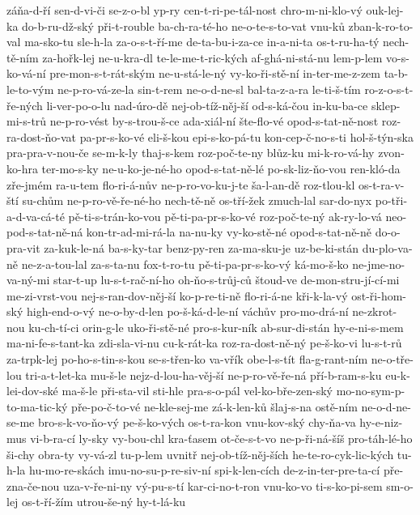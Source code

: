 záňa-d-ří
sen-d-vi-či
se-z-o-bl
yp-ry
cen-t-ri-pe-tál-nost
chro-m-ni-klo-vý
ouk-lej-ka
do-b-ru-dž-ský
při-t-rouble
ba-ch-ra-té-ho
ne-o-te-s-to-vat
vnu-ků
zban-k-ro-to-val
ma-sko-tu
sle-h-la
za-o-s-t-ří-me
de-ta-bu-i-za-ce
in-a-ni-ta
os-t-ru-ha-tý
nech-tě-ním
za-hořk-lej
ne-u-kra-dl
te-le-me-t-ric-kých
af-ghá-ni-stá-nu
lem-p-lem
vo-s-ko-vá-ní
pre-mon-s-t-rát-ským
ne-u-stá-le-ný
vy-ko-ři-stě-ní
in-ter-me-z-zem
ta-b-le-to-vým
ne-p-ro-vá-ze-la
sin-t-rem
ne-o-d-ne-sl
bal-ta-z-a-ra
le-ti-š-tím
ro-z-o-s-t-ře-ných
li-ver-po-o-lu
nad-úro-dě
nej-ob-tíž-něj-ší
od-s-ká-čou
in-ku-ba-ce
sklep-mi-s-trů
ne-p-ro-vést
by-s-trou-š-ce
ada-xiál-ní
šte-flo-vé
opod-s-tat-ně-nost
roz-ra-dost-ňo-vat
pa-pr-s-ko-vé
eli-š-kou
epi-s-ko-pá-tu
kon-cep-č-no-s-ti
hol-š-týn-ska
pra-pra-v-nou-če
se-m-k-ly
thaj-s-kem
roz-poč-te-ny
blůz-ku
mi-k-ro-vá-hy
zvon-ko-hra
ter-mo-s-ky
ne-u-ko-je-né-ho
opod-s-tat-ně-lé
po-sk-liz-ňo-vou
ren-kló-da
zře-jmém
ra-u-tem
flo-ri-á-nův
ne-p-ro-vo-ku-j-te
ša-l-an-dě
roz-tlou-kl
os-t-ra-v-ští
su-chům
ne-p-ro-vě-ře-né-ho
nech-tě-ně
os-tří-žek
zmuch-lal
sar-do-nyx
po-tři-a-d-va-cá-té
pě-ti-s-trán-ko-vou
pě-ti-pa-pr-s-ko-vé
roz-poč-te-ný
ak-ry-lo-vá
neo-pod-s-tat-ně-ná
kon-tr-ad-mi-rá-la
na-nu-ky
vy-ko-stě-né
opod-s-tat-ně-ně
do-o-pra-vit
za-kuk-le-ná
ba-s-ky-tar
benz-py-ren
za-ma-sku-je
uz-be-ki-stán
du-plo-va-ně
ne-z-a-tou-lal
za-s-ta-nu
fox-t-ro-tu
pě-ti-pa-pr-s-ko-vý
ká-mo-š-ko
ne-jme-no-va-ný-mi
star-t-up
lu-s-t-rač-ní-ho
oh-ňo-s-trůj-ců
štoud-ve
de-mon-stru-jí-cí-mi
me-zi-vrst-vou
nej-s-ran-dov-něj-ší
ko-p-re-ti-ně
flo-ri-á-ne
kři-k-la-vý
ost-ři-hom-ský
high-end-o-vý
ne-o-by-d-len
po-š-ká-d-le-ní
váchův
pro-mo-drá-ní
ne-zkrot-nou
ku-ch-tí-ci
orin-g-le
uko-ři-stě-né
pro-s-kur-ník
ab-sur-di-stán
hy-e-ni-s-mem
ma-ni-fe-s-tant-ka
zdi-sla-vi-nu
cu-k-rát-ka
roz-ra-dost-ně-ný
pe-š-ko-vi
lu-s-t-rů
za-trpk-lej
po-ho-s-tin-s-kou
se-s-třen-ko
va-vřík
obe-l-s-tít
fla-g-rant-ním
ne-o-tře-lou
tri-a-t-let-ka
mu-š-le
nejz-d-lou-ha-věj-ší
ne-p-ro-vě-ře-ná
pří-b-ram-s-ku
eu-k-lei-dov-ské
ma-š-le
při-sta-vil
sti-hle
pra-s-o-pál
vel-ko-bře-zen-ský
mo-no-sym-p-to-ma-tic-ký
pře-po-č-to-vé
ne-kle-sej-me
zá-k-len-ků
šlaj-s-na
ostě-ním
ne-o-d-ne-se-me
bro-s-k-vo-ňo-vý
pe-š-ko-vých
os-t-ra-kon
vnu-kov-ský
chy-ňa-va
hy-e-niz-mus
vi-b-ra-cí
ly-sky
vy-bou-chl
kra-ťasem
ot-če-s-t-vo
ne-p-ři-ná-šíš
pro-táh-lé-ho
ši-chy
obra-ty
vy-vá-zl
tu-p-lem
uvnitř
nej-ob-tíž-něj-ších
he-te-ro-cyk-lic-kých
tu-h-la
hu-mo-re-skách
imu-no-su-p-re-siv-ní
spi-k-len-cích
de-z-in-ter-pre-ta-cí
pře-zna-če-nou
uza-v-ře-ni-ny
vý-pu-s-tí
kar-ci-no-t-ron
vnu-ko-vo
ti-s-ko-pi-sem
sm-o-lej
os-t-ří-žím
utrou-še-ný
hy-t-lá-ku
